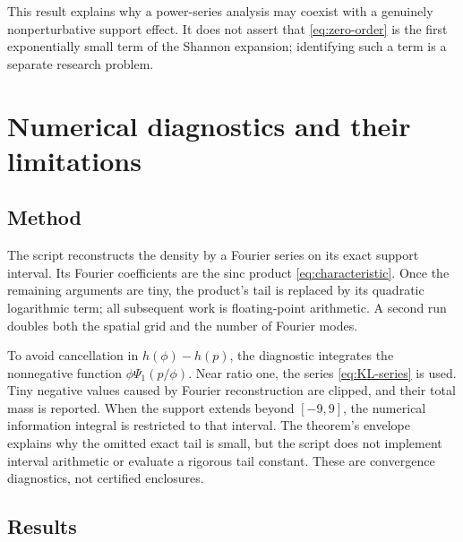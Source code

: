 \documentclass[11pt,a4paper]{article}
\numberwithin{equation}{section}
\theoremstyle{definition}
\theoremstyle{remark}
\begin{document}
This result explains why a power-series analysis may coexist with a genuinely
nonperturbative support effect. It does not assert that
\eqref{eq:zero-order} is the first exponentially small term of the Shannon
expansion; identifying such a term is a separate research problem.

\section{Numerical diagnostics and their limitations}
\label{sec:numerics}

\subsection{Method}

The script  reconstructs the density by a Fourier series
on its exact support interval. Its Fourier coefficients are the sinc product
\eqref{eq:characteristic}. Once the remaining arguments are tiny, the product's
tail is replaced by its quadratic logarithmic term; all subsequent work is
floating-point arithmetic. A second run doubles both the spatial grid and the
number of Fourier modes.

To avoid cancellation in $h(\phi)-h(p)$, the diagnostic integrates the
nonnegative function $\phi\Psi_1(p/\phi)$. Near ratio one, the series
\eqref{eq:KL-series} is used. Tiny negative values caused by Fourier
reconstruction are clipped, and their total mass is reported. When the support
extends beyond $[-9,9]$, the numerical information integral is restricted to
that interval. The theorem's envelope explains why the omitted exact tail is
small, but the script does not implement interval arithmetic or evaluate a
rigorous tail constant. These are convergence diagnostics, not certified
enclosures.

\subsection{Results}
\end{document}
